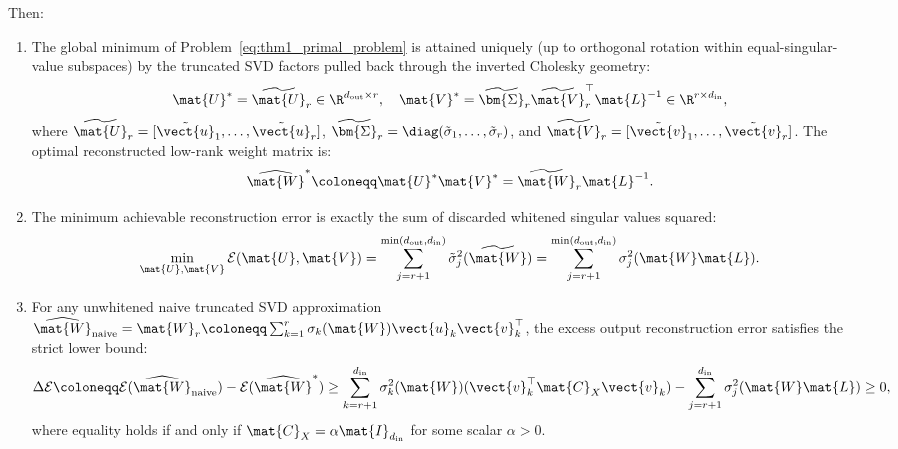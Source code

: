 \begin{theorem}
Then:
\begin{enumerate}
    \item The global minimum of Problem~\eqref{eq:thm1_primal_problem} is attained uniquely (up to orthogonal rotation within equal-singular-value subspaces) by the truncated SVD factors pulled back through the inverted Cholesky geometry:
    \begin{equation}
    \mat{U}^* = \widetilde{\mat{U}}_r \in \R^{d_{\text{out}} \times r}, \quad \mat{V}^* = \widetilde{\bm{\Sigma}}_r \widetilde{\mat{V}}_r^\top \mat{L}^{-1} \in \R^{r \times d_{\text{in}}},
    \label{eq:thm1_optimal_factors}
    \end{equation}
    where $\widetilde{\mat{U}}_r = [\tilde{\vect{u}}_1, \dots, \tilde{\vect{u}}_r]$, $\widetilde{\bm{\Sigma}}_r = \diag(\tilde{\sigma}_1, \dots, \tilde{\sigma}_r)$, and $\widetilde{\mat{V}}_r = [\tilde{\vect{v}}_1, \dots, \tilde{\vect{v}}_r]$.
    The optimal reconstructed low-rank weight matrix is:
    \begin{equation}
    \widehat{\mat{W}}^* \coloneqq \mat{U}^* \mat{V}^* = \widetilde{\mat{W}}_r \mat{L}^{-1}.
    \label{eq:thm1_optimal_weight}
    \end{equation}
    \item The minimum achievable reconstruction error is exactly the sum of discarded whitened singular values squared:
    \begin{equation}
    \min_{\mat{U}, \mat{V}} \mathcal{E}(\mat{U}, \mat{V}) = \sum_{j=r+1}^{\min(d_{\text{out}}, d_{\text{in}})} \tilde{\sigma}_j^2(\widetilde{\mat{W}}) = \sum_{j=r+1}^{\min(d_{\text{out}}, d_{\text{in}})} \sigma_j^2(\mat{W} \mat{L}).
    \label{eq:thm1_min_residual}
    \end{equation}
    \item For any unwhitened naive truncated SVD approximation $\widehat{\mat{W}}_{\text{naive}} = \mat{W}_r \coloneqq \sum_{k=1}^r \sigma_k(\mat{W}) \vect{u}_k \vect{v}_k^\top$, the excess output reconstruction error satisfies the strict lower bound:
    \begin{equation}
    \Delta \mathcal{E} \coloneqq \mathcal{E}(\widehat{\mat{W}}_{\text{naive}}) - \mathcal{E}(\widehat{\mat{W}}^*) \ge \sum_{k=r+1}^{d_{\text{in}}} \sigma_k^2(\mat{W}) (\vect{v}_k^\top \mat{C}_X \vect{v}_k) - \sum_{j=r+1}^{d_{\text{in}}} \sigma_j^2(\mat{W} \mat{L}) \ge 0,
    \label{eq:thm1_excess_error_inequality}
    \end{equation}
    where equality holds if and only if $\mat{C}_X = \alpha \mat{I}_{d_{\text{in}}}$ for some scalar $\alpha > 0$.
\end{enumerate}
\end{theorem}

